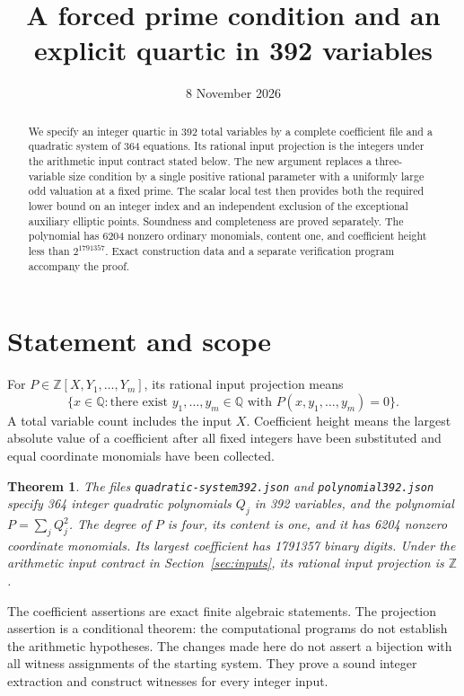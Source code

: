 \documentclass[11pt,a4paper]{article}
\title{A forced prime condition and an explicit quartic in 392 variables}
\author{}\date{8 November 2026}
\newtheorem{theorem}{Theorem}[section]
\theoremstyle{definition}\newtheorem{definition}[theorem]{Definition}
\theoremstyle{remark}\newtheorem{remark}[theorem]{Remark}
\newcommand{\Q}{\mathbb Q}\newcommand{\Z}{\mathbb Z}
\begin{document}
\maketitle
\begin{abstract}
We specify an integer quartic in 392 total variables by a complete coefficient
file and a quadratic system of 364 equations. Its rational input projection
is the integers under the arithmetic input contract stated below. The new
argument replaces a three-variable size condition by a single positive
rational parameter with a uniformly large odd valuation at a fixed prime.
The scalar local test then provides both the required lower bound on an
integer index and an independent exclusion of the exceptional auxiliary
elliptic points. Soundness and completeness are proved separately.
The polynomial has 6204 nonzero ordinary monomials, content one, and
coefficient height less than $2^{1791357}$. Exact construction data and a
separate verification program accompany the proof.
\end{abstract}
\tableofcontents

\section{Statement and scope}
For $P\in\Z[X,Y_1,\ldots,Y_m]$, its rational input projection means
\[
 \{x\in\Q:\text{there exist }y_1,\ldots,y_m\in\Q
                  \text{ with }P(x,y_1,\ldots,y_m)=0\}.
\]
A total variable count includes the input $X$. Coefficient height means the
largest absolute value of a coefficient after all fixed integers have been
substituted and equal coordinate monomials have been collected.

\begin{theorem}\label{thm:main}
The files \nolinkurl{quadratic-system392.json} and
\nolinkurl{polynomial392.json} specify 364 integer quadratic polynomials
$Q_j$ in 392 variables, and the polynomial $P=\sum_jQ_j^2$.
The degree of $P$ is four, its content is one, and it has 6204 nonzero
coordinate monomials. Its largest coefficient has 1791357 binary digits.
Under the arithmetic input contract in Section~\ref{sec:inputs}, its
rational input projection is $\Z$.
\end{theorem}
The coefficient assertions are exact finite algebraic statements. The
projection assertion is a conditional theorem: the computational programs
do not establish the arithmetic hypotheses. The changes made here do not
assert a bijection with all witness assignments of the starting system.
They prove a sound integer extraction and construct witnesses for every
integer input.
\end{document}

